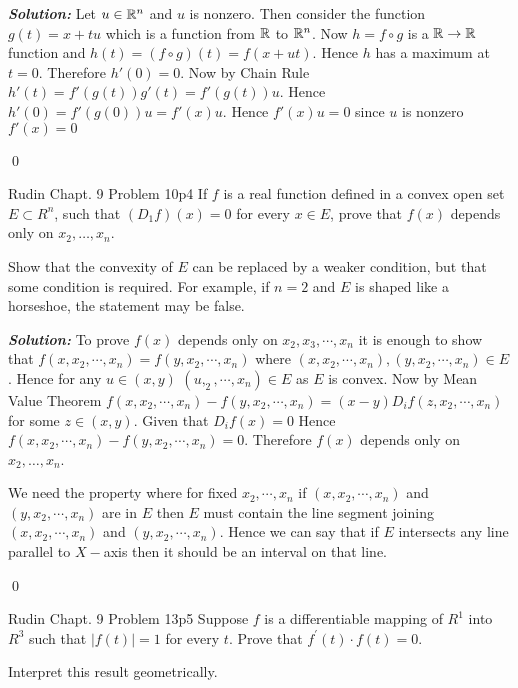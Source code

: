 \documentclass[a4paper, 11pt]{article}
\newcommand{\Qed}{\begin{flushright}\qed\end{flushright}}
\newcommand{\sol}[1]{\begin{solution}#1\end{solution}\Qed}
\newcommand{\parinn}{\setlength{\parindent}{1cm}}
\newenvironment{solution}
{\textbf{\textit{Solution: }}\setlength{\parindent}{1cm}}
{}
\begin{document}
	\sol{Let $u\in \mathbb{R}^n$ and $u$ is nonzero. Then consider the function $g(t)=x+tu$ which is a function from $\mathbb{R}$ to $\mathbb{R}^n$. Now $h=f\circ g$ is a $\mathbb{R}\to\mathbb{R}$ function and $h(t)=(f\circ g)(t)=f(x+ut)$. Hence $h$ has a maximum at $t=0$. Therefore $h'(0)=0$. Now by Chain Rule $h'(t)=f'(g(t))g'(t)=f'(g(t))u$. Hence $h'(0)=f'(g(0))u=f'(x)u$. Hence $f'(x)u=0$ since $u$ is nonzero $f'(x)=0$}
	
	
	
	\begin{problem}{Rudin Chapt. 9 Problem 10}{p4%
		}
				If $f$ is a real function defined in a convex open set $E \subset R^{n}$, such that $\left(D_{1} f\right)(x)=0$ for every $x \in E$, prove that $f(x)$ depends only on $x_{2}, \ldots, x_{n}$.\parinn
				
				Show that the convexity of $E$ can be replaced by a weaker condition, but that some condition is required. For example, if $n=2$ and $E$ is shaped like a horseshoe, the statement may be false.
	\end{problem}
	
	\sol{To prove $f(x)$ depends only on $x_2,x_3,\cdots,x_n$ it is enough to show that $f(x,x_2,\cdots,x_n)=f(y,x_2,\cdots,x_n)$ where $(x,x_2,\cdots,x_n),(y,x_2,\cdots,x_n)\in E$. Hence for any $u\in (x,y)$ $(u,_2,\cdots,x_n)\in E$ as $E$ is convex. Now by Mean Value Theorem $f(x,x_2,\cdots,x_n)-f(y,x_2,\cdots,x_n)=(x-y)D_if(z,x_2,\cdots,x_n)$ for some $z\in (x,y)$. Given that $D_if(x)=0$ Hence $f(x,x_2,\cdots,x_n)-f(y,x_2,\cdots,x_n)=0$. Therefore $f(x)$ depends only on $x_{2}, \ldots, x_{n}$.
		
		We need the property where for fixed $x_2,\cdots,x_n$ if $(x,x_2,\cdots,x_n)$ and $(y,x_2,\cdots,x_n)$ are in $E$ then $E$ must contain the line segment joining $(x,x_2,\cdots,x_n)$ and $(y,x_2,\cdots,x_n)$. Hence we can say that if $E$ intersects any line parallel to $X-$axis then it should be an interval on that line.
	
}
	
	
	
	\begin{problem}{Rudin Chapt. 9 Problem 13}{p5%
		}
		Suppose $f$ is a differentiable mapping of $R^{1}$ into $R^{3}$ such that $|f(t)|=1$ for every $t$. Prove that $f^{\prime}(t) \cdot f(t)=0$.\parinn
		
		Interpret this result geometrically.
	\end{problem}
	
\end{document}
